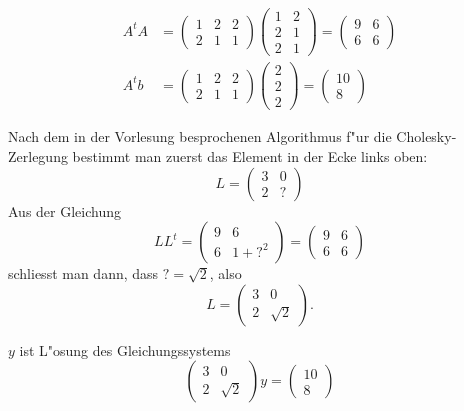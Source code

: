 \begin{loesung}
\begin{teilaufgaben}
\item
\begin{align*}
A^tA&=
\begin{pmatrix}1&2&2\\2&1&1\end{pmatrix}
\begin{pmatrix}1&2\\2&1\\2&1\end{pmatrix}
=
\begin{pmatrix}
9&6\\
6&6
\end{pmatrix}
\\
A^tb&=
\begin{pmatrix}1&2&2\\2&1&1\end{pmatrix}
\begin{pmatrix}2\\2\\2\end{pmatrix}
=
\begin{pmatrix}
10\\8
\end{pmatrix}
\end{align*}
\item Nach dem in der Vorlesung besprochenen Algorithmus f"ur die
Cholesky-Zerlegung bestimmt man zuerst das Element in der Ecke
links oben:
\[
L=\begin{pmatrix}
3&0\\
2&?
\end{pmatrix}
\]
Aus der Gleichung
\[
LL^t=\begin{pmatrix}9&6\\6&1+?^2\end{pmatrix}=\begin{pmatrix}9&6\\6&6\end{pmatrix}
\]
schliesst man dann, dass $?=\sqrt{2}$, also
\[
L=\begin{pmatrix}
3&0\\2&\sqrt{2}
\end{pmatrix}.
\]
\item $y$ ist L"osung des Gleichungssystems
\[
\begin{pmatrix}
3&0\\
2&\sqrt{2}
\end{pmatrix}y=\begin{pmatrix}10\\8\end{pmatrix}
\]
\end{teilaufgaben}
\end{loesung}
